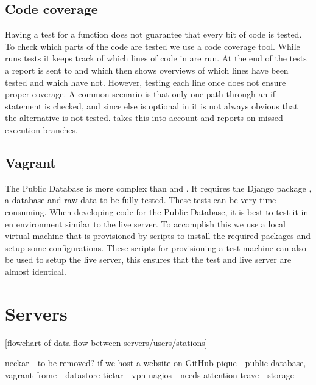\subsection{Code coverage}

Having a test for a function does not guarantee that every bit of code
is tested. To check which parts of the code are tested we use a code
coverage tool. While \travis runs tests it keeps track of which lines of
code in \sapphire are run. At the end of the tests a report is sent to
\coveralls \cite{coveralls} and \codecov \cite{codecov} which then shows overviews of which lines have been tested and which have not. However, testing each line once does not ensure proper coverage. A common scenario is that only one path through an if statement is checked, and since else is optional in \python it is not always obvious that the alternative is not tested. \codecov takes this into account and reports on missed execution branches.


\subsection{Vagrant}

The Public Database is more complex than \sapphire and \jsparc. It
requires the Django package \cite{django}, a database and raw data to be
fully tested. These tests can be very time consuming. When developing
code for the Public Database, it is best to test it in en environment
similar to the live server. To accomplish this we use a local virtual
machine that is provisioned by scripts to install the required packages
and setup some configurations. These scripts for provisioning a test
machine can also be used to setup the live server, this ensures that the
test and live server are almost identical.



\section{Servers}


[flowchart of data flow between servers/users/stations]

neckar - to be removed? if we host a website on GitHub
pique - public database, vagrant
frome - datastore
tietar - vpn nagios - needs attention
trave - storage
